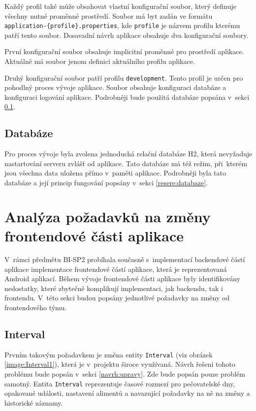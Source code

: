         Každý profil také může obsahovat vlastní konfigurační soubor, který definuje všechny nutné proměnné prostředí. Soubor má byt zadán ve formátu \texttt{application-\{profile\}.properties}, kde \texttt{profile} je názvem profilu kterému patří tento soubor. Dosavadní návrh aplikace obsahuje dva konfigurační soubory.
    
        První konfigurační soubor obsahuje implicitní proměnné pro prostředí aplikace. Aktuálně má soubor jenom definici aktuálního profilu aplikace. 
    
        Druhý konfigurační soubor patří profilu \texttt{development}. Tento profil je určen pro pohodlný proces vývoje aplikace. Soubor obsahuje konfiguraci databáze a konfiguraci logování aplikace. Podrobněji bude použitá databáze popsána v~sekci \ref{analyza:soucasnaImplementace:databaze}.
        
    \subsection{Databáze}\label{analyza:soucasnaImplementace:databaze}
        Pro proces vývoje byla zvolena jednoduchá relační databáze H2, která nevyžaduje nastartování serveru zvlášť od aplikace. Tato databáze má též režim, při~kterém jsou všechna data uložena přímo v~paměti aplikace. Podrobněji byla tato databáze a její princip fungování popsány v~sekci \ref{resere:databaze}.
    
\section{Analýza požadavků na změny frontendové části aplikace}\label{analyza:pozadavky-frontendu}
    V~rámci předmětu BI-SP2 probíhala současně s~implementací backendové částí aplikace implementace frontendové částí aplikace, která je reprezentovaná Android aplikací. Během vývoje frontendové části aplikace byly identifikovány nedostatky, které zbytečně komplikují implementaci, jak backendu, tak i frontendu. V~této sekci budou popsány jednotlivé požadavky na změny od frontendového týmu.
    
    \subsection{Interval}\label{analyza:pozadavky:interval}
        Prvním takovým požadavkem je změna entity \verb|Interval| (viz obrázek \ref{image:Interval1}), která je v~projektu široce využívaná. Návrh řešení tohoto problému bude popsán v~sekci \ref{navrh:upravy}. Zde bude popsán pouze problém samotný. Entita \verb|Interval| reprezentuje časové rozmezí pro pečovatelské dny, opakované události, nastavení alimentů a navazující požadavky na ně na změny a historické záznamy.
            
